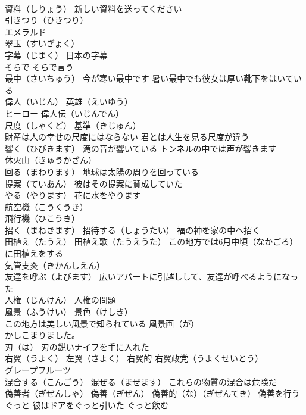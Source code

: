 \documentclass[8pt]{extreport}
\begin{document}
\begin{CJK}{UTF8}{min}
\\	資料（しりょう） 新しい資料を送ってください
\\	引きつり（ひきつり）
\\	エメラルド 
\\	翠玉（すいぎょく）
\\	字幕（じまく） 日本の字幕
\\	そらで そらで言う
\\	最中（さいちゅう） 今が寒い最中です 暑い最中でも彼女は厚い靴下をはいている
\\	偉人（いじん） 英雄（えいゆう） 
\\	ヒーロー 偉人伝（いじんでん）
\\	尺度（しゃくど） 基準（きじゅん）
\\	財産は人の幸せの尺度にはならない 君とは人生を見る尺度が違う
\\	響く（ひびきます） 滝の音が響いている トンネルの中では声が響きます
\\	休火山（きゅうかざん）
\\	回る（まわります） 地球は太陽の周りを回っている
\\	提案（ていあん） 彼はその提案に賛成していた
\\	やる（やります） 花に水をやります
\\	航空機（こうくうき）
\\	飛行機（ひこうき） 
\\	招く（まねきます） 招待する（しょうたい） 福の神を家の中へ招く
\\	田植え（たうえ） 田植え歌（たうえうた） この地方では6月中頃（なかごろ）に田植えをする
\\	気管支炎（きかんしえん）
\\	友達を呼ぶ（よびます） 広いアパートに引越しして、友達が呼べるようになった
\\	人権（じんけん） 人権の問題
\\	風景（ふうけい） 景色（けしき）
\\	この地方は美しい風景で知られている 風景画（が）
\\	かしこまりました。
\\	刃（は） 刃の鋭いナイフを手に入れた
\\	右翼（うよく） 左翼（さよく） 右翼的 右翼政党（うよくせいとう）
\\	グレープフルーツ
\\	混合する（こんごう） 混ぜる（まぜます） これらの物質の混合は危険だ
\\	偽善者（ぎぜんしゃ） 偽善（ぎぜん） 偽善的（な）（ぎぜんてき） 偽善を行う
\\	ぐっと 彼はドアをぐっと引いた ぐっと飲む

\end{CJK}
\end{document}
